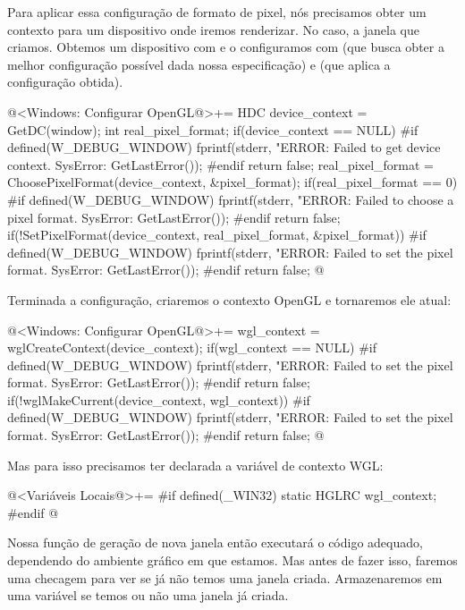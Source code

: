 Para aplicar essa configuração de formato de pixel, nós precisamos
obter um contexto para um dispositivo onde iremos renderizar. No caso,
a janela que criamos. Obtemos um dispositivo com  e
o configuramos com  (que busca obter a
melhor configuração possível dada nossa especificação)
e  (que aplica a configuração obtida).

\iniciocodigo
@<Windows: Configurar OpenGL@>+=
HDC device_context = GetDC(window);
{
  int real_pixel_format;
  if(device_context == NULL){
#if defined(W_DEBUG_WINDOW)
    fprintf(stderr, "ERROR: Failed to get device context. SysError: %
            GetLastError());
#endif
    return false;
  }
  real_pixel_format = ChoosePixelFormat(device_context, &pixel_format);
  if(real_pixel_format == 0){
#if defined(W_DEBUG_WINDOW)
    fprintf(stderr, "ERROR: Failed to choose a pixel format. SysError: %
            GetLastError());
#endif
    return false;
  }
  if(!SetPixelFormat(device_context, real_pixel_format, &pixel_format)){
#if defined(W_DEBUG_WINDOW)
    fprintf(stderr, "ERROR: Failed to set the pixel format. SysError: %
            GetLastError());
#endif
    return false;
  }
}
@
\fimcodigo

Terminada a configuração, criaremos o contexto OpenGL e tornaremos ele
atual:

\iniciocodigo
@<Windows: Configurar OpenGL@>+=
wgl_context = wglCreateContext(device_context);
if(wgl_context == NULL){
#if defined(W_DEBUG_WINDOW)
  fprintf(stderr, "ERROR: Failed to set the pixel format. SysError: %
          GetLastError());
#endif
  return false;
}
if(!wglMakeCurrent(device_context, wgl_context)){
#if defined(W_DEBUG_WINDOW)
  fprintf(stderr, "ERROR: Failed to set the pixel format. SysError: %
          GetLastError());
#endif
  return false;
}
@
\fimcodigo

Mas para isso precisamos ter declarada a variável de contexto WGL:

\iniciocodigo
@<Variáveis Locais@>+=
#if defined(_WIN32)
static HGLRC wgl_context;
#endif
@
\fimcodigo



Nossa função de geração de nova janela então executará o código
adequado, dependendo do ambiente gráfico em que estamos. Mas antes de
fazer isso, faremos uma checagem para ver se já não temos uma janela
criada. Armazenaremos em uma variável se temos ou não uma janela já
criada.

